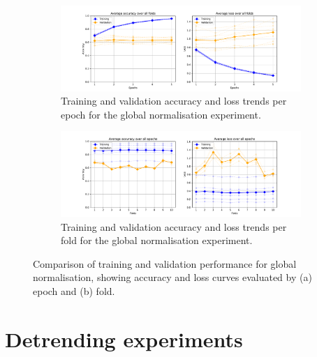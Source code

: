 \vfill
\begin{figure}[htbp]
    \centering
    \begin{subfigure}{\textwidth}
        \centering
        \includegraphics[trim={3cm 0 3cm 0.8cm},clip,width=\textwidth]{img/ch4/global/global_by_epoch.pdf}
        \caption{Training and validation accuracy and loss trends per epoch for the global normalisation experiment.}
        \label{global-norm-by-epoch}
    \end{subfigure}
    
    \vspace{1cm}
    
    \begin{subfigure}{\textwidth}
        \centering
        \includegraphics[trim={3cm 0 3cm 0.8cm},clip,width=\textwidth]{img/ch4/channel/channel_by_fold.pdf}
        \caption{Training and validation accuracy and loss trends per fold for the global normalisation experiment.}
        \label{fig:global-norm-by-fold}
    \end{subfigure}
    \caption{Comparison of training and validation performance for global normalisation, showing accuracy and loss curves evaluated by (a) epoch and (b) fold.} 
    \label{fig:global-norm-acc-loss}
\end{figure}


\newpage
\section{Detrending experiments}\label{curves:detrending}

